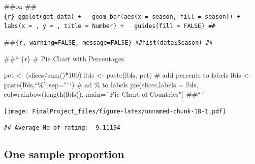 \documentclass[]{article}
\newenvironment{Shaded}{\begin{snugshade}}{\end{snugshade}}
\newcommand{\CommentTok}[1]{\textcolor[rgb]{0.56,0.35,0.01}{\textit{#1}}}
\newcommand{\DataTypeTok}[1]{\textcolor[rgb]{0.13,0.29,0.53}{#1}}
\newcommand{\DecValTok}[1]{\textcolor[rgb]{0.00,0.00,0.81}{#1}}
\newcommand{\KeywordTok}[1]{\textcolor[rgb]{0.13,0.29,0.53}{\textbf{#1}}}
\newcommand{\NormalTok}[1]{#1}
\newcommand{\OperatorTok}[1]{\textcolor[rgb]{0.81,0.36,0.00}{\textbf{#1}}}
\newcommand{\StringTok}[1]{\textcolor[rgb]{0.31,0.60,0.02}{#1}}
\begin{document}
\#\#on
\#\#\texttt{\{r\}\ ggplot(got\_data)\ +\ \ \ geom\_bar(aes(x\ =\ season,\ fill\ =\ season))\ +\ \ \ labs(x\ =\ \textquotesingle{}\textquotesingle{},\ y\ =\ \textquotesingle{}\textquotesingle{},\ title\ =\ \textquotesingle{}Number\textquotesingle{})\ +\ \ \ guides(fill\ =\ FALSE)\ \#\#}

\#\#\texttt{\{r,\ warning=FALSE,\ message=FALSE\}\ \#\#hist(data\$Season)\ \#\#}

\#\#```\{r\} \# Pie Chart with Percentages

pct \textless{}- (slices/sum()*100) lbls \textless{}- paste(lbls, pct)
\# add percents to labels lbls \textless{}- paste(lbls,``\%'',sep="``)
\# ad \% to labels pie(slices,labels = lbls, col=rainbow(length(lbls)),
main=''Pie Chart of Countries") \#\#```

\begin{Shaded}
\end{Shaded}

\texttt{[image: FinalProject\_files/figure-latex/unnamed-chunk-18-1.pdf]}

\begin{Shaded}
\end{Shaded}

\begin{verbatim}
## Average No of rating:  9.11194
\end{verbatim}

\hypertarget{one-sample-proportion}{%
\subsection{One sample proportion}\label{one-sample-proportion}}
\end{document}
